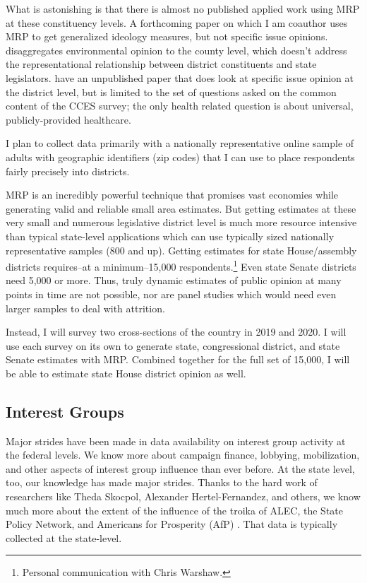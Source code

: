 \documentclass[
  oneside]{book}
\begin{document}
What is astonishing is that there is almost no published applied work using MRP at these constituency levels. A forthcoming paper on which I am coauthor \citep{Rodden:2018} uses MRP to get generalized ideology measures, but not specific issue opinions. \citet{Howe:2015} disaggregates environmental opinion to the county level, which doesn't address the representational relationship between district constituents and state legislators. \citet{Broockman:2017} have an unpublished paper that does look at specific issue opinion at the district level, but is limited to the set of questions asked on the common content of the CCES survey; the only health related question is about universal, publicly-provided healthcare.

I plan to collect data primarily with a nationally representative online sample of adults with geographic identifiers (zip codes) that I can use to place respondents fairly precisely into districts.

MRP is an incredibly powerful technique that promises vast economies while generating valid and reliable small area estimates. But getting estimates at these very small and numerous legislative district level is much more resource intensive than typical state-level applications which can use typically sized nationally representative samples (800 and up). Getting estimates for state House/assembly districts requires--at a minimum--15,000 respondents.\footnote{Personal communication with Chris Warshaw.} Even state Senate districts need 5,000 or more. Thus, truly dynamic estimates of public opinion at many points in time \citep{Pacheco:2017, Pacheco:2017a} are not possible, nor are panel studies which would need even larger samples to deal with attrition.

Instead, I will survey two cross-sections of the country in 2019 and 2020. I will use each survey on its own to generate state, congressional district, and state Senate estimates with MRP. Combined together for the full set of 15,000, I will be able to estimate state House district opinion as well.

\hypertarget{interest-groups}{%
\subsection{Interest Groups}\label{interest-groups}}

Major strides have been made in data availability on interest group activity at the federal levels. We know more about campaign finance, lobbying, mobilization, and other aspects of interest group influence than ever before. At the state level, too, our knowledge has made major strides. Thanks to the hard work of researchers like Theda Skocpol, Alexander Hertel-Fernandez, and others, we know much more about the extent of the influence of the troika of ALEC, the State Policy Network, and Americans for Prosperity (AfP) \citep{Hertel-Fernandez:2014, Hertel-Fernandez:2016, Hertel-Fernandez:2016a, Hertel-Fernandez:2018}. That data is typically collected at the state-level.
\end{document}
